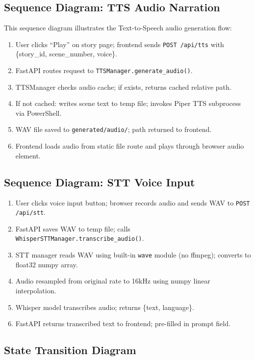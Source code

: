 \subsection{Sequence Diagram: TTS Audio Narration}

This sequence diagram illustrates the Text-to-Speech audio generation flow:
\begin{enumerate}
    \item User clicks ``Play'' on story page; frontend sends \texttt{POST /api/tts} with \{story\_id, scene\_number, voice\}.
    \item FastAPI routes request to \texttt{TTSManager.generate\_audio()}.
    \item TTSManager checks audio cache; if exists, returns cached relative path.
    \item If not cached: writes scene text to temp file; invokes Piper TTS subprocess via PowerShell.
    \item WAV file saved to \texttt{generated/audio/}; path returned to frontend.
    \item Frontend loads audio from static file route and plays through browser audio element.
\end{enumerate}

\subsection{Sequence Diagram: STT Voice Input}

\begin{enumerate}
    \item User clicks voice input button; browser records audio and sends WAV to \texttt{POST /api/stt}.
    \item FastAPI saves WAV to temp file; calls \texttt{WhisperSTTManager.transcribe\_audio()}.
    \item STT manager reads WAV using built-in \texttt{wave} module (no ffmpeg); converts to float32 numpy array.
    \item Audio resampled from original rate to 16kHz using numpy linear interpolation.
    \item Whisper model transcribes audio; returns \{text, language\}.
    \item FastAPI returns transcribed text to frontend; pre-filled in prompt field.
\end{enumerate}

\subsection{State Transition Diagram}

